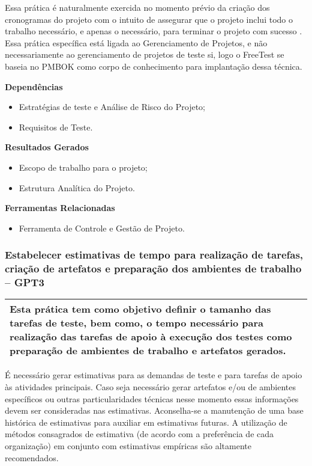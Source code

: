 Essa prática é naturalmente exercida no momento prévio da criação dos cronogramas do projeto com o intuito de assegurar que o projeto inclui todo o trabalho necessário, e apenas o necessário, para terminar o projeto com sucesso \cite{pmbok2014}. Essa prática específica está ligada ao Gerenciamento de Projetos, e não necessariamente ao gerenciamento de projetos de teste si, logo o FreeTest se baseia no PMBOK como corpo de conhecimento para implantação dessa técnica.

\textbf{Dependências}
\begin{itemize}
    \item Estratégias de teste e Análise de Risco do Projeto;
    \item Requisitos de Teste.
\end{itemize}

\textbf{Resultados Gerados}
\begin{itemize}
    \item Escopo de trabalho para o projeto;
    \item Estrutura Analítica do Projeto.
\end{itemize}

\textbf{Ferramentas Relacionadas}
\begin{itemize}
    \item Ferramenta de Controle e Gestão de Projeto.
\end{itemize}

\subsubsection{Estabelecer estimativas de tempo para realização de tarefas, criação de artefatos e preparação dos ambientes de trabalho – GPT3}
\label{sec:gpt3}

\begin{table}[!ht]
\centering
\begin{tabular}{|p{130mm}|}
\hline
Esta prática tem como objetivo definir o tamanho das tarefas de teste, bem como, o tempo necessário para realização das tarefas de apoio à execução dos testes como preparação de ambientes de trabalho e artefatos gerados. \\ 
\hline
\end{tabular}
\end{table}

É necessário gerar estimativas para as demandas de teste e para tarefas de apoio às atividades principais. Caso seja necessário gerar artefatos e/ou de ambientes específicos ou outras particularidades técnicas nesse momento essas informações devem ser consideradas nas estimativas. Aconselha-se a manutenção de uma base histórica de estimativas para auxiliar em estimativas futuras. A utilização de métodos consagrados de estimativa (de acordo com a preferência de cada organização) em conjunto com estimativas empíricas são altamente recomendados.

